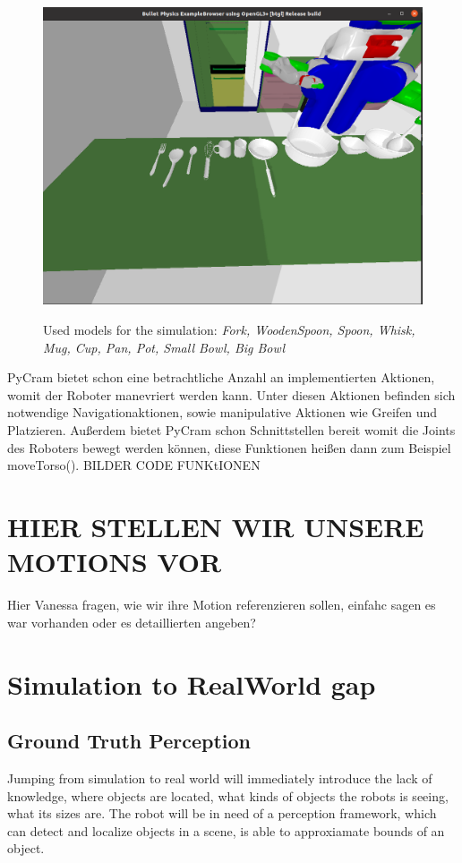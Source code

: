 \begin{figure}[H]
    \includegraphics[scale=0.35]{Graphics/toolscontainersmodels.png}
    \label{fig:toolscontainersmodels}
    \caption{Used models for the simulation: \textit{Fork, WoodenSpoon, Spoon, Whisk, Mug, Cup, Pan, Pot, Small Bowl, Big Bowl}}
\end{figure}

PyCram bietet schon eine betrachtliche Anzahl an implementierten Aktionen, womit der Roboter manevriert werden kann. 
Unter diesen Aktionen befinden sich notwendige Navigationaktionen, sowie manipulative Aktionen wie Greifen und Platzieren. 
Außerdem bietet PyCram schon Schnittstellen bereit womit die Joints des Roboters bewegt werden können, diese Funktionen heißen dann zum Beispiel moveTorso().
BILDER CODE FUNKtIONEN

\section*{HIER STELLEN WIR UNSERE MOTIONS VOR}
Hier Vanessa fragen, wie wir ihre Motion referenzieren sollen, einfahc sagen es war vorhanden oder es detaillierten angeben?

\section*{Simulation to RealWorld gap}
\subsection{Ground Truth Perception}
Jumping from simulation to real world will immediately introduce the lack of knowledge, where objects are located, what kinds of objects
the robots is seeing, what its sizes are. The robot will be in need of a perception framework, which can detect and localize objects in a scene, 
is able to approxiamate bounds of an object. 


